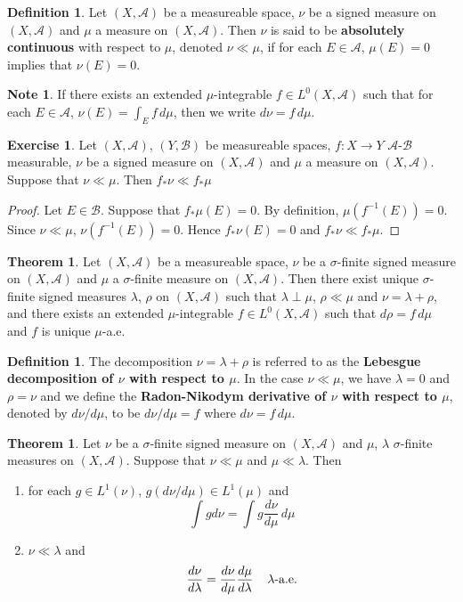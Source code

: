 \documentclass{book}
\theoremstyle{definition}
\newtheorem{defn}[definition]{Definition}
\newtheorem{note}[definition]{Note}
\newtheorem{thm}[definition]{Theorem}
\newtheorem{ex}[definition]{Exercise}
\newcommand{\lam}{\lambda}
\newcommand{\sig}{\sigma}
\newcommand{\MA}{\mathcal{A}}
\newcommand{\MB}{\mathcal{B}}
\newcommand{\ld}[1]{\label{defn:#1}}
\DeclareMathOperator*{\0}{\mbf{0}}
\DeclareMathOperator*{\1}{\mbf{1}}
\newcommand{\dmu}{\, d \mu}
\begin{document}
	\begin{defn} \ld{00000} 
		Let $(X, \MA)$ be a measureable space, $\nu$ be a signed measure on $(X, \MA)$ and $\mu$ a measure on $(X,\MA)$. Then $\nu$ is said to be \textbf{absolutely continuous} with respect to $\mu$, denoted $\nu \ll \mu$, if for each $E \in \MA$, $\mu(E) = 0$ implies that $\nu(E) =0$. 
	\end{defn}
	
	\begin{note}
		If there exists an extended $\mu$-integrable $f \in L^0(X, \MA)$ such that for each $E \in \MA$, $\nu(E) = \int_E f \dmu$, then we write $d\nu = f \dmu$.
	\end{note}
	
	\begin{ex}
	Let $(X, \MA)$, $(Y, \MB)$ be measureable spaces, $f:X \rightarrow Y$ $\MA$-$\MB$ measurable, $\nu$ be a signed measure on $(X, \MA)$ and $\mu$ a measure on $(X,\MA)$. Suppose that $\nu \ll \mu$. Then $f_*\nu \ll f_*\mu$
	\end{ex}
	
	\begin{proof}
	Let $E \in \MB$. Suppose that $f_*\mu(E) = 0$. By definition, $\mu(f^{-1}(E)) = 0$. Since $\nu \ll \mu$, $\nu(f^{-1}(E)) = 0$. Hence $f_*\nu(E) = 0$ and $f_*\nu \ll f_*\mu$.
	\end{proof}
	
	\begin{thm}
		Let $(X, \MA)$ be a measureable space, $\nu$ be a $\sig$-finite signed measure on $(X, \MA)$ and $\mu$ a $\sig$-finite measure on $(X,\MA)$. Then there exist unique $\sig$-finite signed measures $\lam$, $\rho$ on $(X, \MA)$ such that $\lam \perp \mu$, $\rho \ll \mu$ and $\nu = \lam + \rho$, and there exists an extended $\mu$-integrable $f \in L^0(X, \MA)$ such that $d\rho = f \dmu$ and $f$ is unique $\mu$-a.e.  
	\end{thm}
	
	\begin{defn} \ld{00000} 
		The decomposition $\nu = \lam + \rho$ is referred to as the \textbf{Lebesgue decomposition of $\nu$ with respect to $\mu$}. In the case $\nu \ll \mu$, we have $\lam = 0$ and $\rho = \nu$ and we define the \textbf{Radon-Nikodym derivative of $\nu$ with respect to $\mu$}, denoted by $d\nu/d\mu$, to be $d\nu/d\mu = f$ where $d\nu = f\dmu$.   
	\end{defn}
	
	\begin{thm}
		Let $\nu$ be a $\sig$-finite signed measure on $(X, \MA)$ and $\mu$, $\lam$ $\sig$-finite measures on $(X,\MA)$. Suppose that $\nu \ll \mu$ and $\mu \ll \lam$. Then 
		\begin{enumerate}
			\item for each $g \in L^1(\nu)$, $g(d\nu/d\mu) \in  L^1(\mu)$ and $$\int g d\nu = \int g \frac{d\nu}{d\mu} \dmu$$
			\item $\nu \ll \lam$ and $$\frac{d \nu}{d\lam} = \frac{d \nu}{d\mu} \frac{d\mu}{d\lam} \hspace{4mm} \lam \text{-a.e.}$$
		\end{enumerate}
	\end{thm}
	
\end{document}

